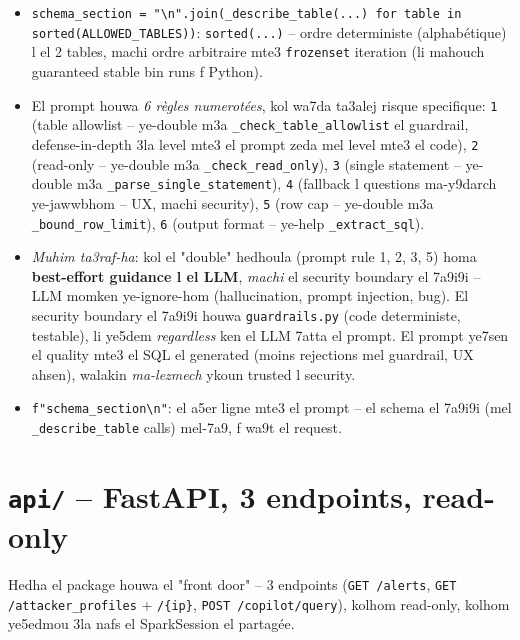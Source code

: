 \documentclass[11pt,a4paper]{report}
\DeclareRobustCommand{\code}[1]{\texttt{#1}}
\DeclareRobustCommand{\file}[1]{\texttt{\color{amber}#1}}
\begin{document}
\begin{itemize}
  \item \code{schema\_section = "\textbackslash{}n".join(\_describe\_table(...) for table
        in sorted(ALLOWED\_TABLES))}: \code{sorted(...)} -- ordre
        deterministe (alphabétique) l el 2 tables, machi ordre
        arbitraire mte3 \code{frozenset} iteration (li mahouch guaranteed
        stable bin runs f Python).
  \item El prompt houwa \emph{6 règles numerotées}, kol wa7da ta3alej
        risque specifique: \code{1} (table allowlist -- ye-double
        m3a \code{\_check\_table\_allowlist} el guardrail, defense-in-depth
        3la level mte3 el prompt zeda mel level mte3 el code), \code{2}
        (read-only -- ye-double m3a \code{\_check\_read\_only}), \code{3}
        (single statement -- ye-double m3a \code{\_parse\_single\_statement}),
        \code{4} (fallback l questions ma-y9darch ye-jawwbhom -- UX,
        machi security), \code{5} (row cap -- ye-double m3a
        \code{\_bound\_row\_limit}), \code{6} (output format -- ye-help
        \code{\_extract\_sql}).
  \item \emph{Muhim ta3raf-ha}: kol el "double" hedhoula (prompt rule 1,
        2, 3, 5) homa \textbf{best-effort guidance l el LLM}, \emph{machi}
        el security boundary el 7a9i9i -- LLM momken ye-ignore-hom
        (hallucination, prompt injection, bug). El security boundary
        el 7a9i9i houwa \code{guardrails.py} (code deterministe,
        testable), li ye5dem \emph{regardless} ken el LLM 7atta el prompt.
        El prompt ye7sen el quality mte3 el SQL el generated (moins
        rejections mel guardrail, UX ahsen), walakin \emph{ma-lezmech}
        ykoun trusted l security.
  \item \code{f"{schema\_section}\textbackslash{}n"}: el a5er ligne mte3 el prompt --
        el schema el 7a9i9i (mel \code{\_describe\_table} calls) mel-7a9,
        f wa9t el request.
\end{itemize}

\chapter{\file{api/} -- FastAPI, 3 endpoints, read-only}

Hedha el package houwa el "front door" -- 3 endpoints (\code{GET /alerts},
\code{GET /attacker\_profiles} + \code{/\{ip\}}, \code{POST /copilot/query}),
kolhom read-only, kolhom ye5edmou 3la nafs el SparkSession el partagée.
\end{document}
